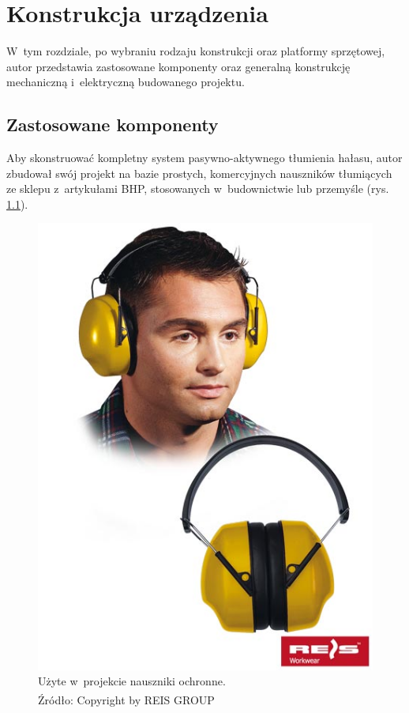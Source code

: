 \chapter{Konstrukcja urządzenia}
\label{cha:constr}
W~tym rozdziale, po wybraniu rodzaju konstrukcji oraz platformy sprzętowej, autor przedstawia zastosowane komponenty oraz generalną konstrukcję mechaniczną  i~elektryczną budowanego projektu.
\section{Zastosowane komponenty}
\label{sec:komponenty}
Aby skonstruować kompletny system pasywno-aktywnego tłumienia hałasu, autor zbudował swój projekt na bazie prostych, komercyjnych nauszników tłumiących ze sklepu z~artykułami BHP, stosowanych w~budownictwie lub przemyśle (rys. \ref{fig:nauszniki_bhp}).
\begin{figure}[h!]
	\centering
	\includegraphics[scale=0.4]{../Assets/nauszniki_bhp.png}
	\caption{Użyte w~projekcie nauszniki ochronne.\\ Źródło: Copyright \textsuperscript{\textcopyright} by REIS GROUP}
	\label{fig:nauszniki_bhp}
\end{figure}

